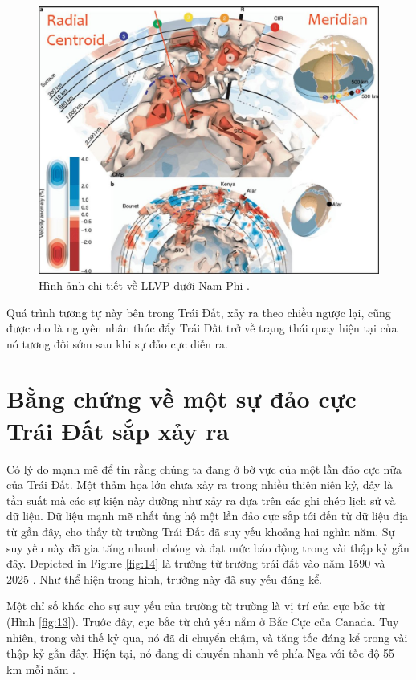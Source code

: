 \documentclass[10pt,twocolumn,letterpaper]{article}
\begin{document}
\begin{figure}[t]
\begin{center}
   \includegraphics[width=1\linewidth]{llvp.jpg}
\end{center}
   \caption{Hình ảnh chi tiết về LLVP dưới Nam Phi \cite{28}.}
\label{fig:12}
\label{fig:onecol}
\end{figure}


Quá trình tương tự này bên trong Trái Đất, xảy ra theo chiều ngược lại, cũng được cho là nguyên nhân thúc đẩy Trái Đất trở về trạng thái quay hiện tại của nó tương đối sớm sau khi sự đảo cực diễn ra.

\section{Bằng chứng về một sự đảo cực Trái Đất sắp xảy ra}

Có lý do mạnh mẽ để tin rằng chúng ta đang ở bờ vực của một lần đảo cực nữa của Trái Đất. Một thảm họa lớn chưa xảy ra trong nhiều thiên niên kỷ, đây là tần suất mà các sự kiện này dường như xảy ra dựa trên các ghi chép lịch sử và dữ liệu. Dữ liệu mạnh mẽ nhất ủng hộ một lần đảo cực sắp tới đến từ dữ liệu địa từ gần đây, cho thấy từ trường Trái Đất đã suy yếu khoảng hai nghìn năm. Sự suy yếu này đã gia tăng nhanh chóng và đạt mức báo động trong vài thập kỷ gần đây.
Depicted in Figure \ref{fig:14} là trường từ trường trái đất vào năm 1590 và 2025 \cite{125,126}. Như thể hiện trong hình, trường này đã suy yếu đáng kể.

Một chỉ số khác cho sự suy yếu của trường từ trường là vị trí của cực bắc từ (Hình \ref{fig:13}). Trước đây, cực bắc từ chủ yếu nằm ở Bắc Cực của Canada. Tuy nhiên, trong vài thế kỷ qua, nó đã di chuyển chậm, và tăng tốc đáng kể trong vài thập kỷ gần đây. Hiện tại, nó đang di chuyển nhanh về phía Nga với tốc độ 55 km mỗi năm \cite{124}.
\end{document}
